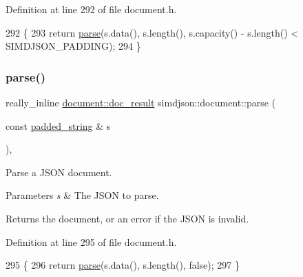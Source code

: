 Definition at line 292 of file document.\+h.


\begin{DoxyCode}
292                                                                             \{
293     \textcolor{keywordflow}{return} \hyperlink{classsimdjson_1_1document_a6f11cda7c4a06fffdc00fdc97d98ae2b}{parse}(s.data(), s.length(), s.capacity() - s.length() < SIMDJSON\_PADDING);
294 \}
\end{DoxyCode}
\mbox{\label{classsimdjson_1_1document_a793655697f46f02ff0def1b940d0155a}} 
\subsubsection{\texorpdfstring{parse()}{parse()}\hspace{0.1cm}{\footnotesize\ttfamily [4/4]}}
{\footnotesize\ttfamily really\+\_\+inline \hyperlink{classsimdjson_1_1document_1_1doc__result}{document\+::doc\+\_\+result} simdjson\+::document\+::parse (\begin{DoxyParamCaption}\item[{const \hyperlink{structsimdjson_1_1padded__string}{padded\+\_\+string} \&}]{s }\end{DoxyParamCaption})\hspace{0.3cm}{\ttfamily [static]}, {\ttfamily [noexcept]}}



Parse a J\+S\+ON document. 


\begin{DoxyParams}{Parameters}
{\em s} & The J\+S\+ON to parse. \\
\hline
\end{DoxyParams}
\begin{DoxyReturn}{Returns}
the document, or an error if the J\+S\+ON is invalid. 
\end{DoxyReturn}


Definition at line 295 of file document.\+h.


\begin{DoxyCode}
295                                                                                 \{
296     \textcolor{keywordflow}{return} \hyperlink{classsimdjson_1_1document_a6f11cda7c4a06fffdc00fdc97d98ae2b}{parse}(s.data(), s.length(), \textcolor{keyword}{false});
297 \}
\end{DoxyCode}
\mbox{\label{classsimdjson_1_1document_ad33e6862de5cd09b2a16b10a90768360}} 
